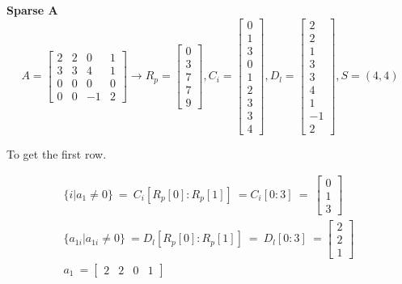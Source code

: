 \documentclass[12pt]{article}
\begin{document}
\noindent
\textbf{Sparse A}
\begin{equation*}
	A=
	\begin{bmatrix}
		2&2&0&1\\
		3&3&4&1\\
		0&0&0&0\\
		0&0&-1&2
	\end{bmatrix} 
	\rightarrow
	R_p=
	\begin{bmatrix}
		0\\
		3\\
		7\\
		7\\
		9
	\end{bmatrix},
		C_i=
	\begin{bmatrix}
		0\\
		1\\
		3\\
		0\\
		1\\
		2\\
		3\\
		3\\
		4
	\end{bmatrix},
	D_l = \begin{bmatrix}
	2\\
	2\\
	1\\
	3\\
	3\\
	4\\
	1\\
	-1\\
	2
	\end{bmatrix},
	S = (4,4)
\end{equation*}

To get the first row.


\begin{gather*}
\{i|a_{1} \neq 0\} \ =\ C_{i}[ R_{p}[ 0] :R_{p}[ 1]] \ =C_{i}[ 0:3] \ =\ \begin{bmatrix}
0\\
1\\
3
\end{bmatrix}\\
\{a_{1i} |a_{1i} \neq 0\} \ =D_{l}[ R_{p}[ 0] :R_{p}[ 1]] \ =\ D_{l}[ 0:3] \ =\begin{bmatrix}
2\\
2\\
1
\end{bmatrix} \ \\
a_{1} \ =\begin{bmatrix}
2 & 2 & 0 & 1
\end{bmatrix} \ 
\end{gather*}
\end{document}
